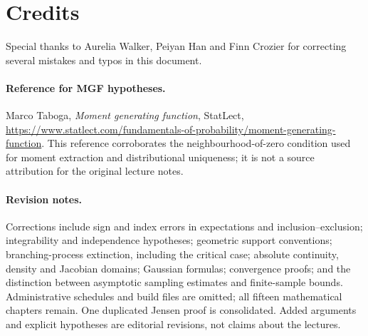 \documentclass[11pt]{article}
\numberwithin{equation}{section}
\theoremstyle{definition}
\theoremstyle{remark}
\begin{document}
\section{Credits}\label{probability-section-17}

Special thanks to Aurelia Walker, Peiyan Han and Finn Crozier for correcting several mistakes and typos in this document.
\paragraph{Reference for MGF hypotheses.}
Marco Taboga, \emph{Moment generating function}, StatLect,
\url{https://www.statlect.com/fundamentals-of-probability/moment-generating-function}.
This reference corroborates the neighbourhood-of-zero condition used for moment
extraction and distributional uniqueness; it is not a source attribution for the
original lecture notes.
\paragraph{Revision notes.}
Corrections include sign and index errors in expectations and inclusion--exclusion;
integrability and independence hypotheses; geometric support conventions;
branching-process extinction, including the critical case; absolute continuity,
density and Jacobian domains; Gaussian formulas; convergence proofs; and the
distinction between asymptotic sampling estimates and finite-sample bounds.
Administrative schedules and build files are omitted; all fifteen mathematical
chapters remain. One duplicated Jensen proof is consolidated. Added arguments
and explicit hypotheses are editorial revisions, not claims about the lectures.
\end{document}

